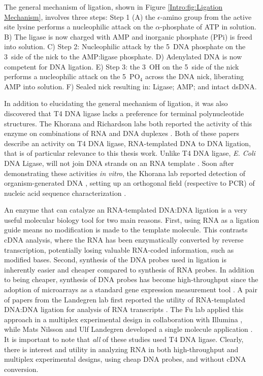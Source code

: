     The general mechanism of ligation, shown in Figure \ref{Intro:fig:Ligation Mechanism}, involves three steps: Step 1 (A) the $\epsilon$-amino group from the active site lysine performs a nucleophilic attack on the $\alpha$-phosphate of ATP in solution. B) The ligase is now charged with AMP and inorganic phosphate (PPi) is freed into solution. C) Step 2: Nucleophilic attack by the 5\textprime~DNA phosphate on the 3\textprime~side of the nick to the AMP:ligase phosphate. D) Adenylated DNA is now competent for DNA ligation. E) Step 3: the 3\textprime~OH on the 5\textprime~side of the nick performs a nucleophilic attack on the 5\textprime~PO$_{4}$ across the DNA nick, liberating AMP into solution. F) Sealed nick resulting in: Ligase; AMP; and intact dsDNA.

    In addition to elucidating the general mechanism of ligation, it was also discovered that T4 DNA ligase lacks a preference for terminal polynucleotide structures. The Khorana and Richardson labs both reported the activity of this enzyme on combinations of RNA and DNA duplexes \citep{Fareed1971, Kleppe1970b}. Both of these papers describe an activity on T4 DNA ligase, RNA-templated DNA to DNA ligation, that is of particular relevance to this thesis work. Unlike T4 DNA ligase, \textit{E. Coli} DNA Ligase, will not join DNA strands on an RNA template \citep{Bullard2006}. Soon after demonstrating these activities \textit{in vitro}, the Khorana lab reported detection of organism-generated DNA \citep{Besmer1972b}, setting up an orthogonal field (respective to PCR) of nucleic acid sequence characterization \citep{Conze2009c}.

    An enzyme that can catalyze an RNA-templated DNA:DNA ligation is a very useful molecular biology tool for two main reasons. First, using RNA as a ligation guide means no modification is made to the template molecule. This contrasts cDNA analysis, where the RNA has been enzymatically converted by reverse transcription, potentially losing valuable RNA-coded information, such as modified bases. Second, synthesis of the DNA probes used in ligation is inherently easier and cheaper compared to synthesis of RNA probes. In addition to being cheaper, synthesis of DNA probes has become high-throughput since the adoption of microarrays as a standard gene expression measurement tool \citep{Schena1995a}. A pair of papers from the Landegren lab first reported the utility of RNA-templated DNA:DNA ligation for analysis of RNA transcripts \citep{Nilsson2000,Nilsson2001}. The Fu lab applied this approach in a multiplex experimental design in collaboration with Illumina \citep{Li2012c,Yeakley2002}, while Mats Nilsson and Ulf Landegren developed a single molecule application \citep{Conze2010}. It is important to note that \textit{all} of these studies used T4 DNA ligase. Clearly, there is interest and utility in analyzing RNA in both high-throughput and multiplex experimental designs, using cheap DNA probes, and without cDNA conversion.

